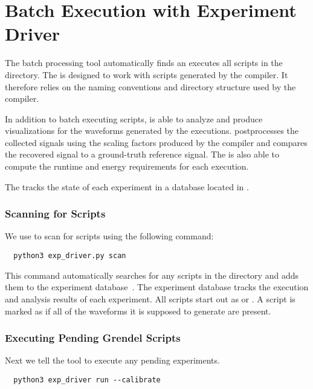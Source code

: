 \chapter{Batch Execution with Experiment Driver}

The \expdriver batch processing tool automatically finds an executes all \grendel scripts in
the  directory. The \expdriver is designed to work with \grendel
scripts generated by the \legno compiler. It therefore relies on the naming
conventions and directory structure used by the \legno compiler.

In addition to batch executing scripts, \expdriver is able to analyze and
produce visualizations for the waveforms generated by the executions. \expdriver
postprocesses the collected signals using the scaling factors produced by the
\legno compiler and compares the recovered signal to a ground-truth reference
signal. The \expdriver is also able to compute the runtime and energy
requirements for each execution.

The \expdriver tracks the state of each experiment in a database located in
.

\subsection{Scanning for \grendel Scripts}

We use \expdriver to scan for \grendel scripts using the following command:

\begin{lstlisting}
  python3 exp_driver.py scan
\end{lstlisting}

This command automatically searches for any \grendel scripts in the 
directory and adds them to the experiment database~\cite{experiment.db}. The
experiment database tracks the execution and analysis results of each
experiment. All scripts start out as  or . A script is
marked as  if all of the waveforms it is supposed to generate are present.


\subsection{Executing Pending Grendel Scripts}
Next we tell the \expdriver tool to execute any pending experiments.

\begin{lstlisting}
  python3 exp_driver run --calibrate
\end{lstlisting}

